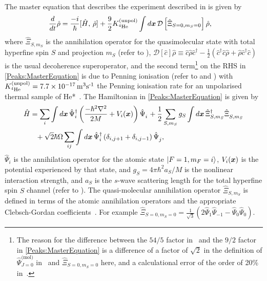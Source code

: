 The master equation that describes the experiment described in  is given by
\begin{align}
    \label{Peaks:MasterEquation}
    \frac{d }{d t}\hat{\rho} &= \frac{-i}{\hbar} [\hat{H},\, \hat{\rho} ] + \frac{9}{2} K^\text{(unpol)}_{^{4}\text{He}} \int d \vect{x}\, \mathcal{D}\left[\hat{\Xi}_{S=0,m_S=0} \right] \hat{\rho},
\end{align}
where $\displaystyle\hat{\Xi}_{S, m_S}$ is the annihilation operator for the quasimolecular state with total hyperfine spin $S$ and projection $m_S$ (refer to ), $\mathcal{D}[\hat{c}]\hat{\rho} \equiv \hat{c}\hat{\rho}\hat{c}^\dagger - \frac{1}{2}(\hat{c}^\dagger \hat{c} \hat{\rho} + \hat{\rho} \hat{c}^\dagger \hat{c})$ is the usual decoherence superoperator, and the second term\footnote{The reason for the difference between the ${54}/{5}$ factor in~\citet{Dall:2009} and the $9/2$ factor in \eqref{Peaks:MasterEquation} is a difference of a factor of $\sqrt{2}$ in the definition of $\hat{\Psi}_{J=0}^{\text{(mol)}}$ in~\citep{Dall:2009} and $\displaystyle\hat{\Xi}_{S=0, m_S=0}$ here, and a calculational error of the order of 20\% in~\citep{Dall:2009}.} on the RHS in \eqref{Peaks:MasterEquation} is due to Penning ionisation (refer to  and ) with $K^\text{(unpol)}_{^{4}\text{He}}=\unit[7.7\times 10^{-17}]{m\textsuperscript{3}s\textsuperscript{-1}}$ the Penning ionisation rate for an unpolarised thermal sample of He*~\citep{Stas:2006kx}. The Hamiltonian in \eqref{Peaks:MasterEquation} is given by
\begin{align}
    \label{Peaks:3DHamiltonian}
    \begin{split}
    \hat{H} &= \sum_i \int d\vect{x}\, \hat{\Psi}_i^\dagger \left(\frac{-\hbar^2 \nabla^2}{2 M} + V_i(\vect{x})\right)\hat{\Psi}_i^{\phantom{\dagger}} + \frac{1}{2}\sum_{S, m_S} g_{S}\int d\vect{x}\, \hat{\Xi}_{S, m_S}^\dagger \hat{\Xi}_{S, m_S}^{\phantom{\dagger}}\\
            &\phantom{=} + \sqrt{2} \hbar \Omega \sum_{i j}\int d\vect{x}\, \hat{\Psi}_i^\dagger \left(\delta_{i, j+1} + \delta_{i, j-1}\right) \hat{\Psi}_j^{\phantom{\dagger}},
    \end{split}
\end{align}
$\displaystyle \hat{\Psi}_i$ is the annihilation operator for the atomic state $\displaystyle {\ensuremath{\left|F=1, m_F=i\right>}}$, $V_i(\bm{x})$ is the potential experienced by that state, and $g_S = 4 \pi \hbar^2 a_S/M$ is the nonlinear interaction strength, and $a_S$ is the $s$-wave scattering length for the total hyperfine spin $S$ channel (refer to ). The quasi-molecular annihilation operator $\displaystyle \hat{\Xi}_{S, m_S}$ is defined in terms of the atomic annihilation operators and the appropriate Clebsch-Gordan coefficients~\citep{Ho:1998}. For example $\displaystyle \hat{\Xi}_{S=0, m_S=0} = \frac{1}{\sqrt{3}} \left( 2 \hat{\Psi}_1 \hat{\Psi}_{-1} - \hat{\Psi}_0 \hat{\Psi}_0\right)$.

